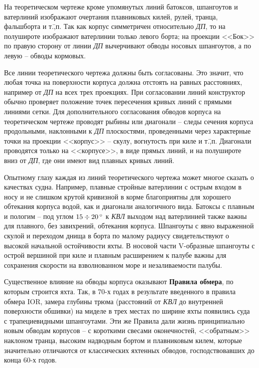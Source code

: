 На теоретическом чертеже кроме упомянутых линий батоксов, шпангоутов и
ватерлиний изображают очертания плавниковых килей, рулей, транца,
фальшборта и т.\=,п. Так как корпус симметричен относительно
\textit{ДП}, то на полушироте изображают ватерлинии только левого
борта; на проекции <<Бок>> по правую сторону от линии \textit{ДП}
вычерчивают обводы носовых шпангоутов, а по левую \--- обводы
кормовых.

Все линии теоретического чертежа должны быть согласованы. Это значит,
что любая точка на поверхности корпуса должна отстоять на равных
расстояниях, например от \textit{ДП} на всех трех проекциях. При
согласовании линий конструктор обычно проверяет положение точек
пересечения кривых линий с прямыми линиями сетки. Для дополнительного
согласования обводов корпуса на теоретическом чертеже проводят рыбины
или диагонали \--- следы сечения корпуса продольными, наклонными к
\textit{ДП} плоскостями, проведенными через характерные точки на
проекции <<корпус>> \--- скулу, вогнутость при киле и
т.\=,п. Диагонали проводятся только на <<корпусе>>, в виде прямых
линий, и на полушироте вниз от \textit{ДП}, где они имеют вид плавных
кривых линий.

Опытному глазу каждая из линий теоретического чертежа может многое
сказать о качествах судна. Например, плавные стройные ватерлинии с
острым входом в носу и не слишком крутой кривизной в корме
благоприятны для хорошего обтекания корпуса водой, как и диагонали
аналогичного вида. Батоксы с плавным и пологим \--- под углом
$15 \div 20\,^\circ$ к \textit{КВЛ} выходом над ватерлинией также важны
для плавного, без завихрений, обтекания корпуса. Шпангоуты с явно
выраженной скулой и переходом днища в борта по малому радиусу
свидетельствуют о высокой начальной остойчивости яхты. В носовой части
V-образные шпангоуты с острой вершиной при киле и плавным расширением
к палубе важны для сохранения скорости на взволнованном море и
незаливаемости палубы.

Существенное влияние на обводы корпуса оказывают \textbf{Правила обмера},
по которым строится яхта. Так, в 70-х годах в результате
введенного в правила обмера IOR, замера глубины трюма (расстояний от
\textit{КВЛ} до внутренней поверхности обшивки) на миделе в трех
местах по ширине яхты появились суда с трапециевидными
шпангоутами. Эти же Правила дали жизнь принципиально новым обводам
корпусов \--- с короткими свесами оконечностей, <<обратным>> наклоном
транца, высоким надводным бортом и плавниковым килем, которые
значительно отличаются от классических яхтенных обводов,
господствовавших до конца 60-х годов.

